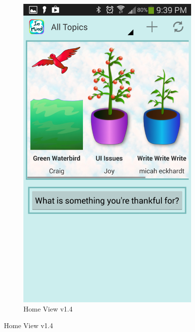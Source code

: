 \begin{figure}
\begin{subfigure}[b]{0.4\textwidth}
      \includegraphics[width=\textwidth]{planter_final.png}
       \caption{Home View v1.4}
    \end{subfigure}
    \label{fig:home_screens}
  \end{figure}

